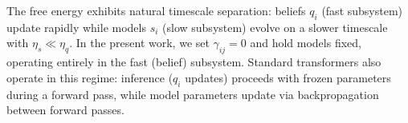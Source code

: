 \documentclass[twoside,11pt]{article}
\begin{document}
The free energy exhibits natural timescale separation: beliefs $q_i$ (fast subsystem) update rapidly while models $s_i$ (slow subsystem) evolve on a slower timescale with $\eta_s \ll \eta_q$. In the present work, we set $\gamma_{ij} = 0$ and hold models fixed, operating entirely in the fast (belief) subsystem. Standard transformers also operate in this regime: inference ($q_i$ updates) proceeds with frozen parameters during a forward pass, while model parameters update via backpropagation between forward passes.




\end{document}
